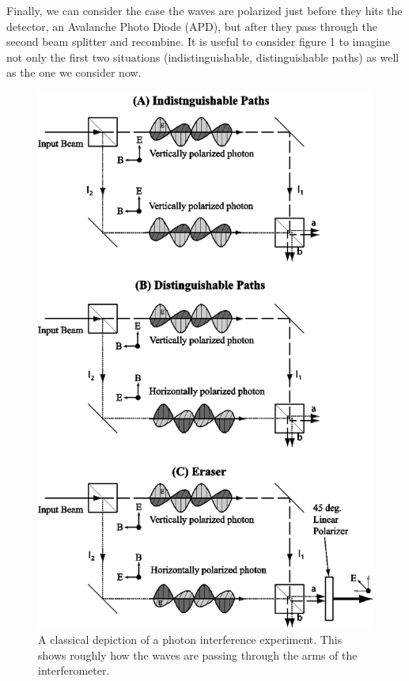 \documentclass{article}
\begin{document}
	\hspace{.25cm}

	Finally, we can consider the case the waves are polarized just before they hits the detector, an Avalanche Photo Diode (APD), but after they pass through the second beam splitter and recombine.  It is useful to consider figure 1 to imagine not only the first two situations (indistinguishable, distinguishable paths) as well as the one we consider now.

	\begin{figure}[!htb]
		\centering
		\includegraphics[scale=.5]{interferometer_wave.png}
		\caption{A classical depiction of a photon interference experiment.  This shows roughly how the waves are passing through the arms of the interferometer.}
	\end{figure}
\end{document}
